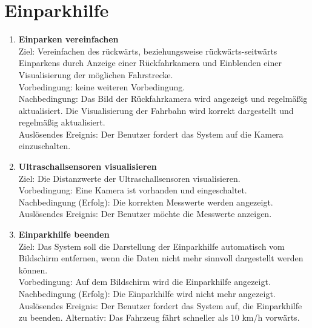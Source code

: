 \documentclass[pflichtenheft.tex]{subfiles}
\begin{document}
	\section{Einparkhilfe}
	
	\begin{enumerate}
	\setcounter{enumi}{\value{enumTemp}}

	\item{\textbf{Einparken vereinfachen}} \\ Ziel: Vereinfachen des rückwärts, beziehungsweise rückwärts-seitwärts Einparkens durch Anzeige einer Rückfahrkamera und Einblenden einer Visualisierung der möglichen Fahrstrecke. \\
	Vorbedingung: keine weiteren Vorbedingung. \\ Nachbedingung: Das Bild der Rückfahrkamera wird angezeigt und regelmäßig aktualisiert. Die Visualisierung der Fahrbahn wird korrekt dargestellt und regelmäßig aktualisiert.\\
	Auslösendes Ereignis: Der Benutzer fordert das System auf die Kamera einzuschalten. 

	\item{\textbf{Ultraschallsensoren visualisieren}} \label{ultrasound} \\ Ziel: Die Distanzwerte der Ultraschallsensoren visualisieren. \\ Vorbedingung: Eine Kamera ist vorhanden und eingeschaltet.\\
	Nachbedingung (Erfolg): Die korrekten Messwerte werden angezeigt.\\
	Auslösendes Ereignis: Der Benutzer möchte die Messwerte anzeigen.

	\item{\textbf{Einparkhilfe beenden}} \label{quit:passist} \\ Ziel: Das System soll die Darstellung der Einparkhilfe automatisch vom Bildschirm entfernen, wenn die Daten nicht mehr sinnvoll dargestellt werden können. \\ Vorbedingung: Auf dem Bildschirm wird die Einparkhilfe angezeigt. \\ Nachbedingung (Erfolg): Die Einparkhilfe wird nicht mehr angezeigt.\\
	Auslösendes Ereignis: Der Benutzer fordert das System auf, die Einparkhilfe zu beenden. Alternativ: Das Fahrzeug fährt schneller als 10 km/h vorwärts.

	\setcounter{enumTemp}{\value{enumi}}

	\end{enumerate}
	
\end{document}
